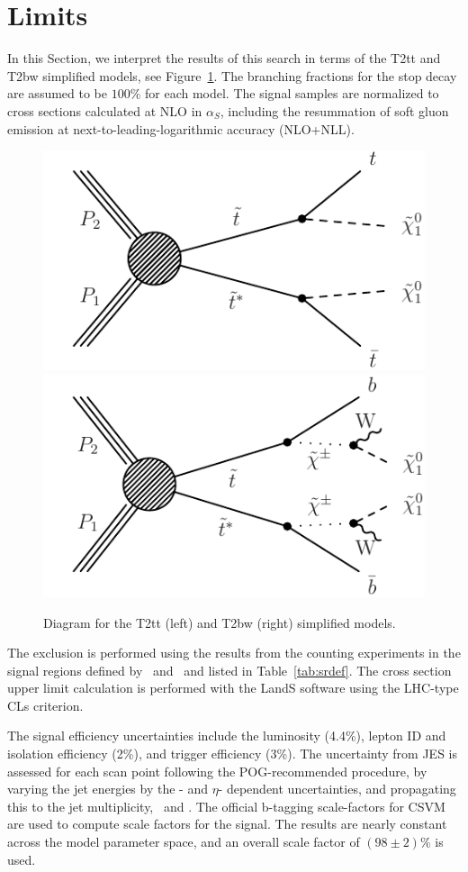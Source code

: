 \section{Limits}
\label{sec:signal}

In this Section, we interpret the results of this search in terms of
the T2tt and T2bw simplified models, see Figure~\ref{fig:SigDiagram}.
The branching fractions for the stop decay are assumed to be $100\%$
for each model. The signal samples are normalized to cross sections
calculated at NLO in $\alpha_S$, including the resummation of soft gluon emission at 
next-to-leading-logarithmic accuracy (NLO+NLL). 

\begin{figure}[hbt]
  \begin{center}
        \includegraphics[width=0.5\linewidth]{plots/stopPlot/T2tt.pdf}%
        \includegraphics[width=0.5\linewidth]{plots/stopPlot/T2bw.pdf}%
	\caption{Diagram for the T2tt (left) and T2bw (right)
          simplified models.}
	\label{fig:SigDiagram}
      \end{center}
\end{figure}

The exclusion is performed using the results from the counting experiments in the signal regions
defined by \met\ and \mt\ and listed in Table~\ref{tab:srdef}. 
The cross section upper limit calculation is performed with the LandS software using the LHC-type CLs criterion. 

The signal efficiency uncertainties include the luminosity (4.4\%), lepton ID and isolation
efficiency (2\%), and trigger efficiency (3\%). The uncertainty from JES
is assessed for each scan point following the POG-recommended
procedure, by varying the jet energies by the \pt- and $\eta$-
dependent uncertainties, and propagating this to the jet multiplicity,
\met\ and \mt. The official b-tagging scale-factors for CSVM are used to compute scale
factors for the signal. The results are nearly constant across the
model parameter space, and an overall scale factor of $(98 \pm 2)\%$
is used. 
 

